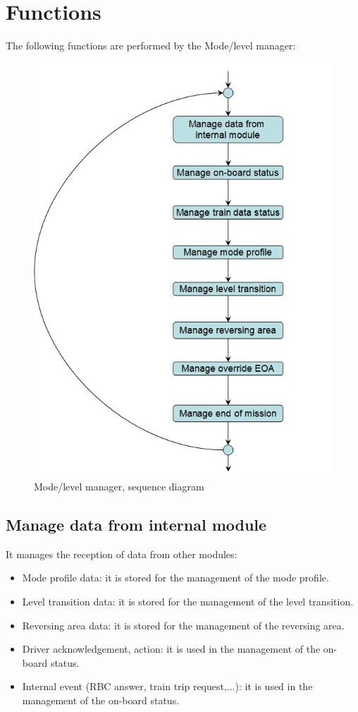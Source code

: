 \documentclass[nocc]{template/openetcs_report}
\begin{document}
\section{Functions}
The following functions are performed by the Mode/level manager:
\begin{figure}[!h]
  \centering
  \includegraphics[width=\textwidth]{image/evc_mode_level_manager}
  \caption{Mode/level manager, sequence diagram}
  \label{fig:Mode/level manager, sequence diagram}
\end{figure}
\subsection{Manage data from internal module}
It manages the reception of data from other modules:
\begin{itemize}
\item Mode profile data: it is stored for the management of the mode profile.
\item Level transition data: it is stored for the management of the level transition.
\item Reversing area data: it is stored for the management of the reversing area.
\item Driver acknowledgement, action: it is used in the management of the on-board status.
\item Internal event (RBC answer, train trip request,...): it is used in the management of the on-board status.
\end{itemize}
\end{document}
